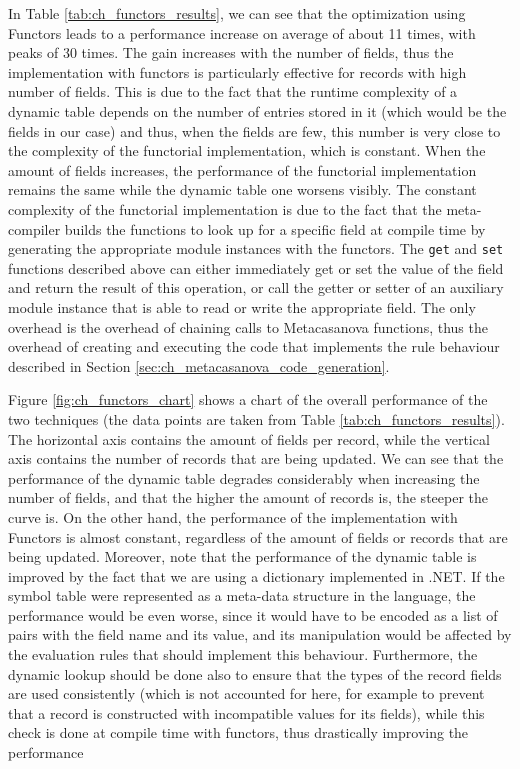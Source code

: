In Table \ref{tab:ch_functors_results}, we can see that the optimization using Functors leads to a performance increase on average of about 11 times, with peaks of 30 times. The gain increases with the number of fields, thus the implementation with functors is particularly effective for records with high number of fields. This is due to the fact that the runtime complexity of a dynamic table depends on the number of entries stored in it (which would be the fields in our case) and thus, when the fields are few, this number is very close to the complexity of the functorial implementation, which is constant. When the amount of fields increases, the performance of the functorial implementation remains the same while the dynamic table one worsens visibly. The constant complexity of the functorial implementation is due to the fact that the meta-compiler builds the functions to look up for a specific field at compile time by generating the appropriate module instances with the functors. The \texttt{get} and \texttt{set} functions described above can either immediately get or set the value of the field and return the result of this operation, or call the getter or setter of an auxiliary module instance that is able to read or write the appropriate field. The only overhead is the overhead of chaining calls to Metacasanova functions, thus the overhead of creating and executing the code that implements the rule behaviour described in Section \ref{sec:ch_metacasanova_code_generation}.

Figure \ref{fig:ch_functors_chart} shows a chart of the overall performance of the two techniques (the data points are taken from Table \ref{tab:ch_functors_results}). The horizontal axis contains the amount of fields per record, while the vertical axis contains the number of records that are being updated. We can see that the performance of the dynamic table degrades considerably when increasing the number of fields, and that the higher the amount of records is, the steeper the curve is. On the other hand, the performance of the implementation with Functors is almost constant, regardless of the amount of fields or records that are being updated. Moreover, note that the performance of the dynamic table is improved by the fact that we are using a dictionary implemented in .NET. If the symbol table were represented as a meta-data structure in the language, the performance would be even worse, since it would have to be encoded as a list of pairs with the field name and its value, and its manipulation would be affected by the evaluation rules that should implement this behaviour. Furthermore, the dynamic lookup should be done also to ensure that the types of the record fields are used consistently (which is not accounted for here, for example to prevent that a record is constructed with incompatible values for its fields), while this check is done at compile time with functors, thus drastically improving the performance

